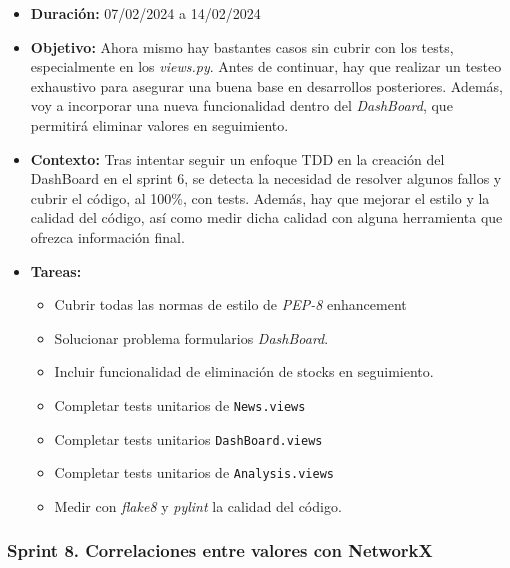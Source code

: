 \begin{itemize}
\item  
\textbf{Duración:} 07/02/2024 a 14/02/2024

\item
\textbf{Objetivo:} Ahora mismo hay bastantes casos sin cubrir con los tests, especialmente en los \emph{views.py}. Antes de continuar, hay que realizar un testeo exhaustivo para asegurar una buena base en desarrollos posteriores. Además, voy a incorporar una nueva funcionalidad dentro del \emph{DashBoard}, que permitirá eliminar valores en seguimiento.

\item
\textbf{Contexto:} Tras intentar seguir un enfoque TDD en la creación del DashBoard en el sprint 6, se detecta la necesidad de resolver algunos fallos y cubrir el código, al 100\%, con tests. Además, hay que mejorar el estilo y la calidad del código, así como medir dicha calidad con alguna herramienta que ofrezca información final.

\item
\textbf{Tareas:}
	\begin{itemize}
	\tightlist
	\item 
	Cubrir todas las normas de estilo de \emph{PEP-8} enhancement
	\item
	Solucionar problema formularios \emph{DashBoard}.
	\item
	Incluir funcionalidad de eliminación de stocks en seguimiento.
	\item
	Completar tests unitarios de \texttt{News.views}
	\item
	Completar tests unitarios \texttt{DashBoard.views}
	\item
	Completar tests unitarios de \texttt{Analysis.views}
	\item
	Medir con \emph{flake8} y \emph{pylint} la calidad del código.
  	\end{itemize}
\end{itemize}


\subsubsection{Sprint 8. Correlaciones entre valores con NetworkX}


